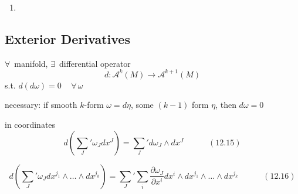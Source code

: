 \begin{enumerate}
\[
\begin{gathered}
  (F^*\omega) \wedge (F^* \eta) e_{\underline{K}} = \omega_{\underline{J}} DF^{\underline{J}}_{\underline{I}} \eta_{\underline{L}} DF^{\underline{L}}_{ \underline{M}} (e^{\underline{I}} \wedge e^{\underline{M}} ) e_{\underline{K}} = \omega_{\underline{J}} \eta_{\underline{L}} DF^{\underline{J}}_{\underline{I}} DF^{\underline{L}}_{\underline{M}} \delta^{\underline{I}\underline{M}}_{\underline{K}}     = \omega_{\underline{I}} \eta_{\underline{J}} DF^{\underline{I}}_{\underline{L}} DF^{\underline{J}}_{\underline{M}} \delta^{\underline{L} \underline{M}}_{\underline{K}}
\end{gathered}
\]
\item[(c)]
\end{enumerate}


\subsection*{ Exterior Derivatives }

$\forall \, $ manifold, $\exists \, $ differential operator
\[
d: \mathcal{A}^k(M) \to \mathcal{A}^{k+1}(M)
\]
s.t. $d(d\omega ) =0 \quad \, \forall \, \omega$

necessary: if smooth $k$-form $\omega = d\eta$, some $(k-1)$ form $\eta$, then $d\omega =0$

in coordinates
\begin{equation}
  d \left( \sum_J' \omega_J dx^J \right) = \sum_J' d\omega_J \wedge dx^J \quad \quad \quad (12.15)
\end{equation}

\begin{equation}
  d\left( \sum_J' \omega_J dx^{j_1} \wedge \dots \wedge dx^{j_k} \right) = \sum_J' \sum_i \frac{ \partial \omega_J}{ \partial x^i} dx^i \wedge dx^{j_1} \wedge \dots \wedge dx^{j_k} \quad \quad \quad (12.16)
\end{equation}


